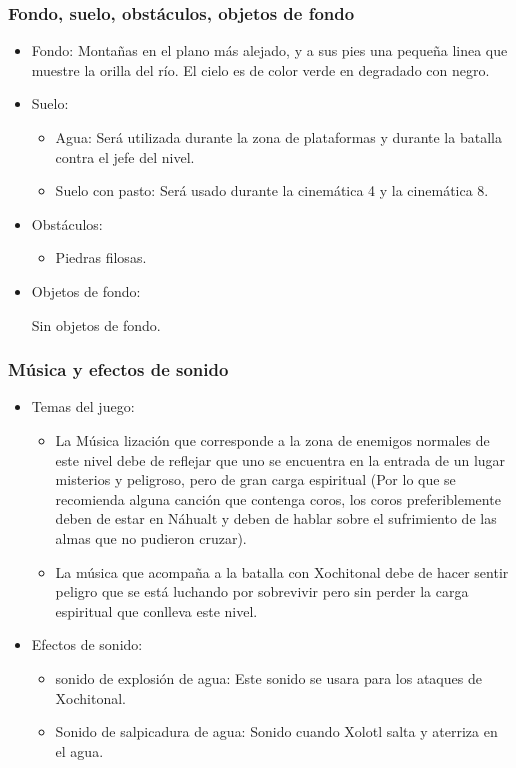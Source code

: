 \documentclass[11pt,letterpaper]{article}
\begin{document}
\subsubsection{Fondo, suelo, obstáculos, objetos de fondo}
\begin{itemize} 
	\item Fondo:
Montañas en el plano más alejado, y a sus pies una pequeña linea que muestre la orilla del río. El cielo es de color verde en degradado con negro.
	\item Suelo:
		\begin{itemize}
			\item Agua: Será utilizada durante la zona de plataformas y durante la batalla contra el jefe del nivel.
			\item Suelo con pasto: Será usado durante la cinemática 4 y la cinemática 8.
		\end{itemize}
	\item Obstáculos:
		\begin{itemize}
			\item Piedras filosas.
				
		\end{itemize}
	\item Objetos de fondo: 
	\\
	\par	
	Sin objetos de fondo.
	
\end{itemize}	
	
	\subsubsection{Música y efectos de sonido}
\begin{itemize}
	\item Temas del juego:
		\begin{itemize}
			\item La Música lización que corresponde a la zona de enemigos normales de este nivel debe de reflejar que uno se encuentra en la entrada de un lugar misterios y peligroso, pero de gran carga espiritual (Por lo que se recomienda alguna canción que contenga coros, los coros preferiblemente deben de estar en Náhualt y deben de hablar sobre el sufrimiento de las almas que no pudieron cruzar).
			\item La música que acompaña a la batalla con Xochitonal debe de hacer sentir peligro que se está luchando por sobrevivir pero sin perder la carga espiritual que conlleva este nivel.
		\end{itemize}
	\item Efectos de sonido:
		\begin{itemize}
			\item sonido de explosión de agua: Este sonido se usara para los ataques de Xochitonal.
			\item Sonido de salpicadura de agua: Sonido cuando Xolotl salta y aterriza en el agua. 
		\end{itemize}
\end{itemize}
\end{document}
